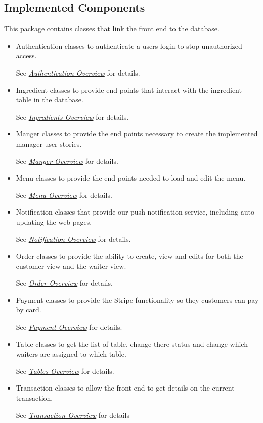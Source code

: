 \documentclass[12pt, twoside, a4paper]{report}
\begin{document}
\subsection*{Implemented Components}
This package contains classes that link the front end to the database.
\begin{itemize}
  \item Authentication classes to authenticate a users login to stop unauthorized access. 

    See \textit{\href{run:../JavaDoc/endpoints/authentication/package-summary.html}{Authentication Overview}} for details.
  \item Ingredient classes to provide end points that interact with the ingredient table in the database.

    See \textit{\href{run:../JavaDoc/endpoints/ingredient/package-summary.html}{Ingredients Overview}} for details.
  \item Manger classes to provide the end points necessary to create the implemented manager user stories.

    See \textit{\href{run:../JavaDoc/endpoints/manager/package-summary.html}{Manger Overview}} for details.
  \item Menu classes to provide the end points needed to load and edit the menu.

    See \textit{\href{run:../JavaDoc/endpoints/menu/package-summary.html}{Menu Overview}} for details.
  \item Notification classes that provide our push notification service, including auto updating the web pages.

    See \textit{\href{run:../JavaDoc/endpoints/notification/package-summary.html}{Notification Overview}} for details.
  \item Order classes to provide the ability to create, view and edits for both the customer view and the waiter view.

    See \textit{\href{run:../JavaDoc/endpoints/order/package-summary.html}{Order Overview}} for details.
  \item Payment classes to provide the Stripe functionality so they customers can pay by card.

    See \textit{\href{run:../JavaDoc/endpoints/payment/package-summary.html}{Payment Overview}} for details.
  \item Table classes to get the list of table, change there status and change which waiters are assigned to which table.

    See \textit{\href{run:../JavaDoc/endpoints/tables/package-summary.html}{Tables Overview}} for details.
  \item Transaction classes to allow the front end to get details on the current transaction.

    See \textit{\href{run:../JavaDoc/endpoints/transaction/package-summary.html}{Transaction Overview}} for details
\end{itemize}
\end{document}
